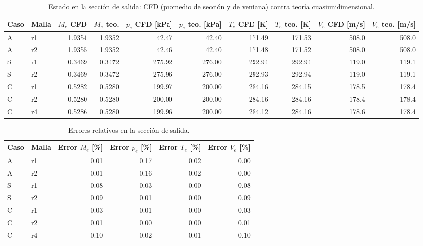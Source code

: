 \begin{table}[H]
\centering
\caption{Estado en la sección de salida: CFD (promedio de sección y de ventana) contra teoría cuasiunidimensional.}
\label{tab:estado-salida}
\footnotesize\setlength{\tabcolsep}{3pt}
\begin{tabular}{llrrrrrrrr}
\toprule
Caso & Malla & $M_e$ CFD & $M_e$ teo. & $p_e$ CFD [kPa] & $p_e$ teo. [kPa] & $T_e$ CFD [K] & $T_e$ teo. [K] & $V_e$ CFD [m/s] & $V_e$ teo. [m/s] \\
\midrule
A & r1 & 1.9354 & 1.9352 & 42.47 & 42.40 & 171.49 & 171.53 & 508.0 & 508.0 \\
A & r2 & 1.9355 & 1.9352 & 42.46 & 42.40 & 171.48 & 171.52 & 508.0 & 508.0 \\
S & r1 & 0.3469 & 0.3472 & 275.92 & 276.00 & 292.94 & 292.94 & 119.0 & 119.1 \\
S & r2 & 0.3469 & 0.3472 & 275.96 & 276.00 & 292.93 & 292.94 & 119.0 & 119.1 \\
C & r1 & 0.5282 & 0.5280 & 199.97 & 200.00 & 284.16 & 284.15 & 178.5 & 178.4 \\
C & r2 & 0.5280 & 0.5280 & 200.00 & 200.00 & 284.16 & 284.16 & 178.4 & 178.4 \\
C & r4 & 0.5286 & 0.5280 & 199.96 & 200.00 & 284.12 & 284.16 & 178.6 & 178.4 \\
\bottomrule
\end{tabular}
\end{table}

\begin{table}[H]
\centering
\caption{Errores relativos en la sección de salida.}
\label{tab:estado-salida-err}
\small\setlength{\tabcolsep}{4pt}
\begin{tabular}{llrrrr}
\toprule
Caso & Malla & Error $M_e$ [\%] & Error $p_e$ [\%] & Error $T_e$ [\%] & Error $V_e$ [\%] \\
\midrule
A & r1 & 0.01 & 0.17 & 0.02 & 0.00 \\
A & r2 & 0.01 & 0.16 & 0.02 & 0.00 \\
S & r1 & 0.08 & 0.03 & 0.00 & 0.08 \\
S & r2 & 0.09 & 0.01 & 0.00 & 0.09 \\
C & r1 & 0.03 & 0.01 & 0.00 & 0.03 \\
C & r2 & 0.01 & 0.00 & 0.00 & 0.01 \\
C & r4 & 0.10 & 0.02 & 0.01 & 0.10 \\
\bottomrule
\end{tabular}
\end{table}
